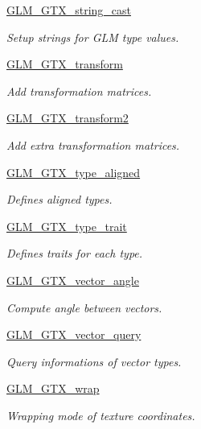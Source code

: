 \begin{DoxyCompactItemize}
\hyperlink{group__gtx__string__cast}{G\+L\+M\+\_\+\+G\+T\+X\+\_\+string\+\_\+cast}
\begin{DoxyCompactList}\small\item\em Setup strings for G\+LM type values. \end{DoxyCompactList}\item 
\hyperlink{group__gtx__transform}{G\+L\+M\+\_\+\+G\+T\+X\+\_\+transform}
\begin{DoxyCompactList}\small\item\em Add transformation matrices. \end{DoxyCompactList}\item 
\hyperlink{group__gtx__transform2}{G\+L\+M\+\_\+\+G\+T\+X\+\_\+transform2}
\begin{DoxyCompactList}\small\item\em Add extra transformation matrices. \end{DoxyCompactList}\item 
\hyperlink{group__gtx__type__aligned}{G\+L\+M\+\_\+\+G\+T\+X\+\_\+type\+\_\+aligned}
\begin{DoxyCompactList}\small\item\em Defines aligned types. \end{DoxyCompactList}\item 
\hyperlink{group__gtx__type__trait}{G\+L\+M\+\_\+\+G\+T\+X\+\_\+type\+\_\+trait}
\begin{DoxyCompactList}\small\item\em Defines traits for each type. \end{DoxyCompactList}\item 
\hyperlink{group__gtx__vector__angle}{G\+L\+M\+\_\+\+G\+T\+X\+\_\+vector\+\_\+angle}
\begin{DoxyCompactList}\small\item\em Compute angle between vectors. \end{DoxyCompactList}\item 
\hyperlink{group__gtx__vector__query}{G\+L\+M\+\_\+\+G\+T\+X\+\_\+vector\+\_\+query}
\begin{DoxyCompactList}\small\item\em Query informations of vector types. \end{DoxyCompactList}\item 
\hyperlink{group__gtx__wrap}{G\+L\+M\+\_\+\+G\+T\+X\+\_\+wrap}
\begin{DoxyCompactList}\small\item\em Wrapping mode of texture coordinates. \end{DoxyCompactList}\end{DoxyCompactItemize}


